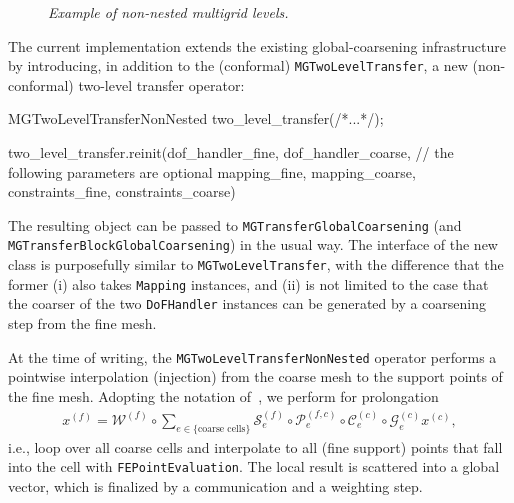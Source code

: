 \documentclass{ansarticle-preprint}
\begin{document}
\begin{figure}

\centering



\caption{\it Example of non-nested multigrid levels.}\label{fig:nonnested}

\end{figure}

The current implementation extends the existing global-coarsening infrastructure by
introducing, in addition to the (conformal) \texttt{MGTwoLevelTransfer},
 a new (non-conformal) two-level transfer operator:
\begin{c++}
MGTwoLevelTransferNonNested two_level_transfer(/*...*/);

two_level_transfer.reinit(dof_handler_fine, dof_handler_coarse,
                          // the following parameters are optional
                          mapping_fine, mapping_coarse, 
                          constraints_fine, constraints_coarse)
\end{c++}
The resulting object can be passed to \texttt{MGTransferGlobalCoarsening} (and
\texttt{MGTransferBlockGlobalCoarsening}) in the usual way. The
interface of the new class is purposefully similar to
\texttt{MGTwoLevelTransfer},
with the difference that the former (i) also
takes \texttt{Mapping} instances, and (ii) is not limited to the case
that the coarser of the two \texttt{DoFHandler} instances can be generated by a coarsening step from the fine
mesh.

At the time of writing, the \texttt{MGTwoLevelTransferNonNested} operator performs
a pointwise interpolation (injection) from the coarse mesh to the support points
of the fine mesh. Adopting the notation of~\cite{munch2022gc}, we perform
for prolongation
\begin{align*}
x^{(f)} = \mathcal{W}^{(f)} \circ \sum_{e \in \{\text{coarse cells}\}} \mathcal{S}_e^{(f)} \circ \mathcal{P}_e^{(f, c)}
\circ \mathcal{C}_e^{(c)} \circ \mathcal{G}_e^{(c)} x^{(c)},
\end{align*}
i.e., loop over all coarse cells and interpolate to all (fine support) points that fall
into the cell with \texttt{FEPointEvaluation}. The local result is scattered into a global
vector, which is finalized by a communication and a weighting step.
\end{document}
